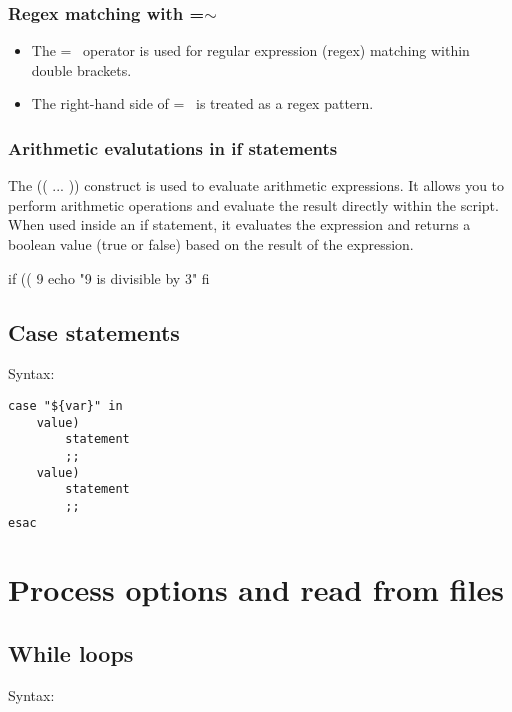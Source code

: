 \documentclass{report}
\begin{document}
    \bigbreak \noindent 
    \subsubsection{Regex matching with =$\sim$}
    \bigbreak \noindent 
    \begin{itemize}
        \item The =~ operator is used for regular expression (regex) matching within double brackets.
        \item The right-hand side of =~ is treated as a regex pattern.
    \end{itemize}

    \bigbreak \noindent
    \subsubsection{Arithmetic evalutations in if statements}
    \bigbreak \noindent 
    The (( ... )) construct is used to evaluate arithmetic expressions. It allows you to perform arithmetic operations and evaluate the result directly within the script. When used inside an if statement, it evaluates the expression and returns a boolean value (true or false) based on the result of the expression.
    \bigbreak \noindent 
    \begin{bashcode}
    if (( 9 %
        echo "9 is divisible by 3"
    fi 
    \end{bashcode}
    

    \pagebreak \bigbreak \noindent 
    \subsection{Case statements}
    \bigbreak \noindent 
    Syntax:
    
    \begin{verbatim}
case "${var}" in 
    value)
        statement
        ;;
    value)
        statement
        ;;
esac
    \end{verbatim}
    \bigbreak \noindent
    
    \bigbreak \noindent 

    \pagebreak \bigbreak \noindent 
    \section{\LARGE Process options and read from files}
    \bigbreak \noindent 
    \subsection{While loops}
    \bigbreak \noindent 
    Syntax:
    
\end{document}
